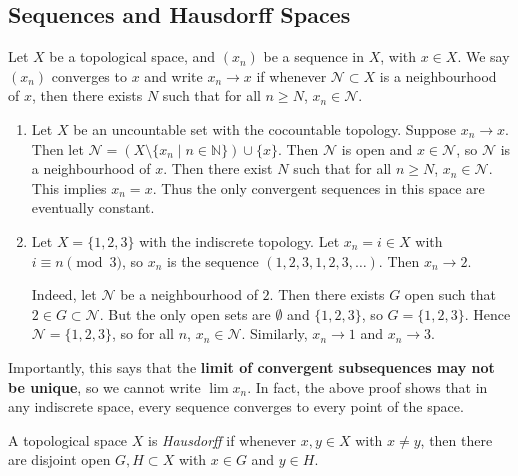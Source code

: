 \documentclass[12pt]{article}
\begin{document}
\subsection{Sequences and Hausdorff Spaces}%
\label{sub:sequences_and_hausdorff_spaces}

\begin{definition}
	Let $X$ be a topological space, and $(x_n)$ be a sequence in $X$, with $x \in X$. We say $(x_n)$ converges to $x$ and write $x_n \to x$ if whenever $\mathcal{N} \subset X$ is a neighbourhood of $x$, then there exists $N$ such that for all $n \geq N$, $x_n \in \mathcal{N}$.
\end{definition}

\begin{exbox}
	\begin{enumerate}[1.]
		\item Let $X$ be an uncountable set with the cocountable topology. Suppose $x_n \to x$. Then let $\mathcal{N} = (X \setminus\{x_n \mid n\in \mathbb{N}\}) \cup\{x\}$. Then $\mathcal{N}$ is open and $x \in \mathcal{N}$, so $\mathcal{N}$ is a neighbourhood of $x$. Then there exist $N$ such that for all $n \geq N$, $x_n \in \mathcal{N}$. This implies $x_n = x$. Thus the only convergent sequences in this space are eventually constant.
		\item Let $X = \{1, 2, 3\}$ with the indiscrete topology. Let $x_n = i \in X$ with $i \equiv n \pmod 3$, so $x_n$ is the sequence $(1, 2, 3, 1, 2, 3, \ldots)$. Then $x_n \to 2$.

			Indeed, let $\mathcal{N}$ be a neighbourhood of $2$. Then there exists $G$ open such that $2 \in G \subset \mathcal{N}$. But the only open sets are $\emptyset$ and $\{1, 2, 3\}$, so $G = \{1, 2, 3\}$. Hence $\mathcal{N} = \{1, 2, 3\}$, so for all $n$, $x_n \in \mathcal{N}$. Similarly, $x_n \to 1$ and $x_n \to 3$.
	\end{enumerate}
\end{exbox}

Importantly, this says that the \textbf{limit of convergent subsequences may not be unique}, so we cannot write $\lim x_n$. In fact, the above proof shows that in any indiscrete space, every sequence converges to every point of the space.

\begin{definition}
	A topological space $X$ is \textit{Hausdorff} if whenever $x, y \in X$ with $x \neq y$, then there are disjoint open $G, H \subset X$ with $x \in G$ and $y \in H$.
\end{definition}
\end{document}
